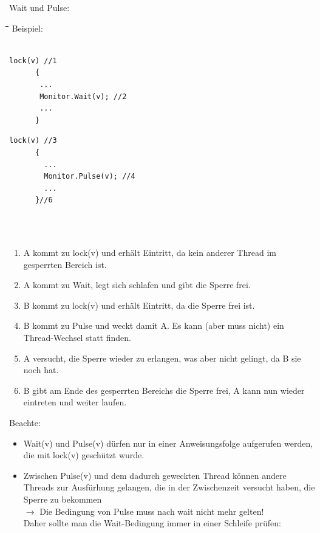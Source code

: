 Wait und Pulse:
\begin{tabbing}
  \hspace*{1cm}\=\hspace*{4.2cm}\=\hspace*{3cm}\=\hspace*{2.7cm}\= \kill
  Beispiel:\\
   \> \> \\
  \>\begin{lstlisting}[style=C]
      lock(v) //1
      {
       ...
       Monitor.Wait(v); //2
       ...
      }
    \end{lstlisting} \> \> \>
    \begin{lstlisting}[style=C]
      lock(v) //3
      {
        ...
        Monitor.Pulse(v); //4
        ...
      }//6
    \end{lstlisting} \\\\
\end{tabbing}
\begin{enumerate}
   \item A kommt zu lock(v) und erhält Eintritt, da kein anderer Thread im
   gesperrten Bereich ist. 
   \item A kommt zu Wait, legt sich schlafen und gibt die Sperre frei. 
   \item B kommt zu lock(v) und erhält Eintritt, da die Sperre frei ist. 
   \item B kommt zu Pulse und weckt damit A. Es kann (aber muss nicht) ein
   Thread-Wechsel statt finden. 
   \item A versucht, die Sperre wieder zu erlangen, was aber nicht gelingt, da B
   sie noch hat. 
   \item B gibt am Ende des gesperrten Bereichs die Sperre frei, A kann nun
   wieder eintreten und weiter laufen. 
\end{enumerate}
Beachte: 
\begin{itemize}
   \item Wait(v) und Pulse(v) dürfen nur in einer Anweisungsfolge aufgerufen
   werden, die mit lock(v) geschützt wurde.
   \item Zwischen Pulse(v) und dem dadurch geweckten Thread können andere
   Threads zur Ausfürhung gelangen, die in der Zwischenzeit versucht haben, die
   Sperre zu bekommen\\ $\rightarrow$ Die Bedingung von Pulse muss nach wait
   nicht mehr gelten!\\
   Daher sollte man die Wait-Bedingung immer in einer Schleife prüfen: 
\end{itemize}
